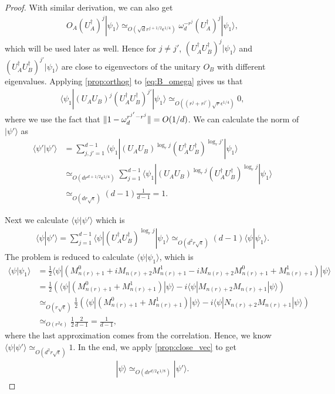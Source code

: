 \documentclass[11pt,letterpaper]{article}
\newcommand{\ket}[1]{|#1\rangle}
\newcommand{\bra}[1]{\langle#1|}
\newcommand{\braket}[2]{\langle#1|#2\rangle}
\newcommand{\ct}{^{\dagger}}
\DeclarePairedDelimiter{\norm}{\lVert}{\rVert}
\newcommand{\1}{\mathbb{1}}
\newcommand{\nr}{n(r)}
\newcommand{\ep}{\epsilon}
\newcommand{\se}{\sqrt{\epsilon}}
\newcommand{\qe}{\epsilon^{1/4}}
\newcommand{\sd}{\sqrt{d}}
\newcommand{\sr}{\sqrt{r}}
\newcommand{\appd}[1]{\simeq_{#1}}
\theoremstyle{definition}
\begin{document}
\begin{proof}
    With similar derivation, we can also get
    \begin{align}
    \label{eq:A_omega}
        O_A (U_A\ct)^j \ket{\psi_1} \appd{O(\sd r^{j+1/2} \qe)}\omega_d^{-r^j}  (U_A\ct)^j \ket{\psi_1},
    \end{align}
    which will be used later as well.
	Hence for $j \neq j'$, $(U_A\ct U_B\ct)^{j} \ket{\psi_1}$ and $(U_A\ct U_B\ct)^{ j'} \ket{\psi_1}$ are close to eigenvectors
	of the unitary $O_B$ with different eigenvalues.
	Applying \cref{prop:orthog} to \cref{eq:B_omega} gives us that  
	\begin{align*}
		\bra{\psi_1} (U_AU_B)^{j} (U_A\ct U_B\ct)^{ j'} \ket{\psi_1} \appd{O( (r^j + r^{j'})\sr \qe)} 0,
	\end{align*}
	where we use the fact that $\norm{1 - \omega_d^{r^{j'}-r^j}} = O(1/d)$.
	We can calculate the norm of $\ket{\psi'}$ as 
	\begin{align*}
		\braket{\psi'}{\psi'} &=\sum_{j,j'=1}^{d-1} \bra{\psi_1} (U_AU_B)^{\log_r j} (U_A\ct U_B\ct)^{\log_r j'} \ket{\psi_1}\\
		&\appd{O(dr^{d+1/2} \qe)} \sum_{j=1}^{d-1} \bra{\psi_1} (U_AU_B)^{\log_r j} (U_A\ct U_B\ct)^{\log_r j} \ket{\psi_1}\\
		&\appd{O(dr\se)} (d-1) \frac{1}{d-1} = 1.
	\end{align*}
	
	Next we calculate $\braket{\psi}{\psi'}$ which is
	\begin{align*}
		\braket{\psi}{\psi'} = \sum_{j=1}^{d-1} \bra{\psi} (U_A\ct U_B\ct)^{\log_r j} \ket{\psi_1}
		 \appd{O(d^2r\se)} (d-1) \braket{\psi}{\psi_1}.
	\end{align*}
	The problem is reduced to calculate $\braket{\psi}{\psi_1}$, which is
	\begin{align*}
		\braket{\psi}{\psi_1} &= \frac{1}{2} \bra{\psi} (M_{\nr+1}^0 + iM_{\nr+2}M_{\nr+1}^1 - iM_{\nr+2}M_{\nr+1}^0 +M_{\nr+1}^1) \ket{\psi}\\
		& = \frac{1}{2} \left(\bra{\psi}(M_{\nr+1}^0 + M_{\nr+1}^1) \ket{\psi} - i \bra{\psi}M_{\nr+2}M_{\nr+1} \ket{\psi} \right)\\
		& \appd{O(r\se)} \frac{1}{2} \left(\bra{\psi}(M_{\nr+1}^0 + M_{\nr+1}^1) \ket{\psi}  - i \bra{\psi}N_{\nr+2}M_{\nr+1} \ket{\psi} \right)\\
		& \appd{O(r^2 \ep)} \frac{1}{2} \frac{2}{d-1} = \frac{1}{d-1},
	\end{align*}
	where the last approximation comes from the correlation.
	Hence, we know $\braket{\psi}{\psi'} \appd{O(d^2 r \se)} 1$.
	In the end, we apply \cref{prop:close_vec} to get
	\begin{align*}
		\ket{\psi} \appd{O(d r^{d/2} \ep^{1/8})} \ket{\psi'}.
	\end{align*}
\end{proof}
\end{document}
